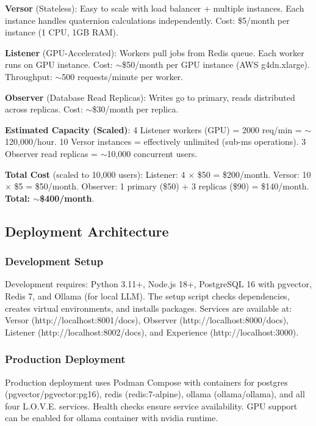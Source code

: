 \textbf{Versor} (Stateless): Easy to scale with load balancer + multiple instances. Each instance handles quaternion calculations independently. Cost: \$5/month per instance (1 CPU, 1GB RAM).

\textbf{Listener} (GPU-Accelerated): Workers pull jobs from Redis queue. Each worker runs on GPU instance. Cost: $\sim$\$50/month per GPU instance (AWS g4dn.xlarge). Throughput: $\sim$500 requests/minute per worker.

\textbf{Observer} (Database Read Replicas): Writes go to primary, reads distributed across replicas. Cost: $\sim$\$30/month per replica.

\textbf{Estimated Capacity (Scaled)}: 4 Listener workers (GPU) = 2000 req/min = $\sim$120,000/hour. 10 Versor instances = effectively unlimited (sub-ms operations). 3 Observer read replicas = $\sim$10,000 concurrent users.

\textbf{Total Cost} (scaled to 10,000 users): Listener: 4 $\times$ \$50 = \$200/month. Versor: 10 $\times$ \$5 = \$50/month. Observer: 1 primary (\$50) + 3 replicas (\$90) = \$140/month. \textbf{Total: $\sim$\$400/month}.

\subsection{Deployment Architecture}

\subsubsection{Development Setup}

Development requires: Python 3.11+, Node.js 18+, PostgreSQL 16 with pgvector, Redis 7, and Ollama (for local LLM). The setup script checks dependencies, creates virtual environments, and installs packages. Services are available at: Versor (http://localhost:8001/docs), Observer (http://localhost:8000/docs), Listener (http://localhost:8002/docs), and Experience (http://localhost:3000).

\subsubsection{Production Deployment}

Production deployment uses Podman Compose with containers for postgres (pgvector/pgvector:pg16), redis (redis:7-alpine), ollama (ollama/ollama), and all four L.O.V.E. services. Health checks ensure service availability. GPU support can be enabled for ollama container with nvidia runtime.

